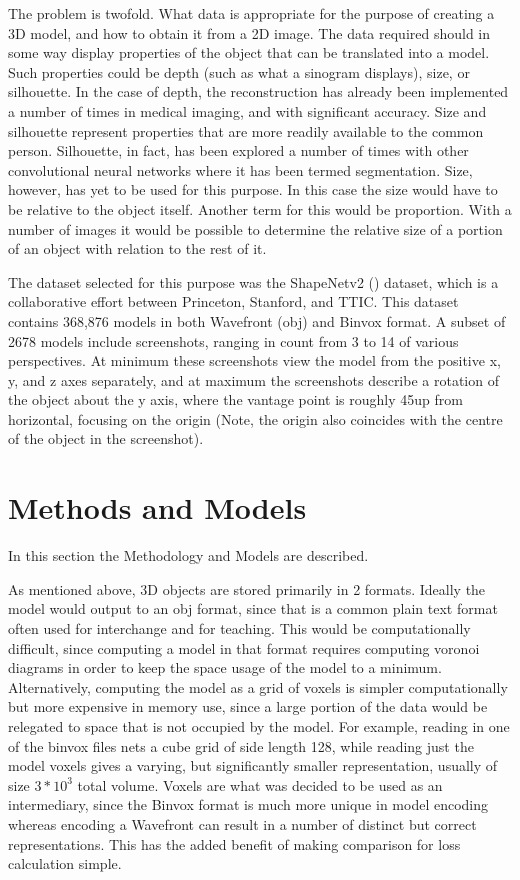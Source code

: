 \documentclass{article}
\begin{document}
The problem is twofold. 
What data is appropriate for the purpose of creating a 
3D model, and how to obtain it from a 2D image. 
The data required should in some way display properties of the object that can
be translated into a model. 
Such properties could be depth (such as what a sinogram displays), size, 
or silhouette. 
In the case of depth, the reconstruction has already been implemented a number of
times in medical imaging, and with significant accuracy. 
Size and silhouette represent properties that are more readily available to the
common person. 
Silhouette, in fact, has been explored a number of times with other 
convolutional neural networks where it has been termed segmentation. 
Size, however, has yet to be used for this purpose. 
In this case the size would have to be relative to the object itself. 
Another term for this would be proportion. 
With a number of images it would be possible to determine the relative size of 
a portion of an object with relation to the rest of it. 

The dataset selected for this purpose was the ShapeNetv2 (\cite{shapenet2015}) dataset, which is a collaborative effort between Princeton, Stanford, and TTIC\@. 
This dataset contains 368,876 models in both Wavefront (obj) and Binvox format.
A subset of 2678 models include screenshots, ranging in count from 3 to 14 of
various perspectives. 
At minimum these screenshots view the model from the positive x, y, and z axes
separately, and at maximum the screenshots describe a rotation of the object about
the y axis, where the vantage point is roughly 45\textdegree up from horizontal,
focusing on the origin (Note, the origin also coincides with the centre of the
object in the screenshot).

\section{Methods and Models}

In this section the Methodology and Models are described.

As mentioned above, 3D objects are stored primarily in 2 formats. 
Ideally the model would output to an obj format, since that is a common plain text
format often used for interchange and for teaching. 
This would be computationally difficult, since computing a model in that format
requires computing voronoi diagrams in order to keep the space usage of the 
model to a minimum. 
Alternatively, computing the model as a grid of voxels is simpler computationally
but more expensive in memory use, since a large portion of the data would be 
relegated to space that is not occupied by the model. 
For example, reading in one of the binvox files nets a cube grid of side length
128, while reading just the model voxels gives a varying, but significantly 
smaller representation, usually of size $3*10^{3}$ total volume. 
Voxels are what was decided to be used as an intermediary, since the Binvox
format is much more unique in model encoding whereas encoding a Wavefront can 
result in a number of distinct but correct representations.
This has the added benefit of making comparison for loss calculation simple. 
\end{document}
